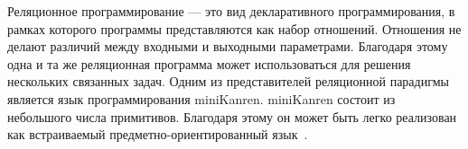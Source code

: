 

Реляционное программирование --- это вид декларативного программирования, в рамках которого программы представляются как набор
отношений. Отношения не делают различий между входными и выходными параметрами. Благодаря этому одна и та же реляционная
программа может использоваться для решения нескольких связанных
задач. Одним из представителей реляционной парадигмы является
язык программирования miniKanren. miniKanren состоит из небольшого числа примитивов. Благодаря этому он может быть легко реализован как встраиваемый предметно-ориентированный язык~\cite{moiseenko_podkopaev}. 






